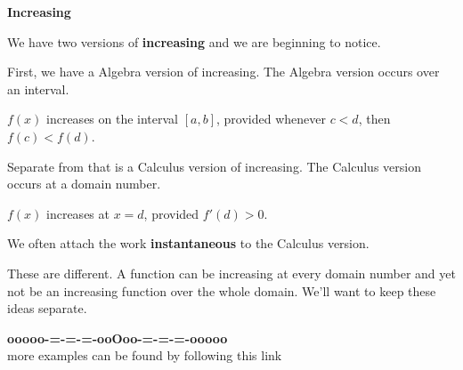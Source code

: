 \documentclass{ximera}
\begin{document}
\begin{warning} \textbf{\textcolor{red!70!black}{Increasing}}



We have two versions of \textbf{increasing} and we are beginning to notice.



First, we have a Algebra version of increasing.  The Algebra version occurs over an interval.  

$f(x)$ increases on the interval $[a,b]$, provided whenever $c < d$, then $f(c) < f(d)$. 









Separate from that is a Calculus version of increasing. The Calculus version occurs at a domain number.

$f(x)$ increases at $x=d$, provided $f'(d) > 0$. 

We often attach the work \textbf{instantaneous} to the Calculus version.




These are different.  A function can be increasing at every domain number and yet not be an increasing function over the whole domain.  We'll want to keep these ideas separate.





\end{warning}









\begin{center}
\textbf{\textcolor{green!50!black}{ooooo-=-=-=-ooOoo-=-=-=-ooooo}} \\

more examples can be found by following this link\\ 

\end{center}
\end{document}
